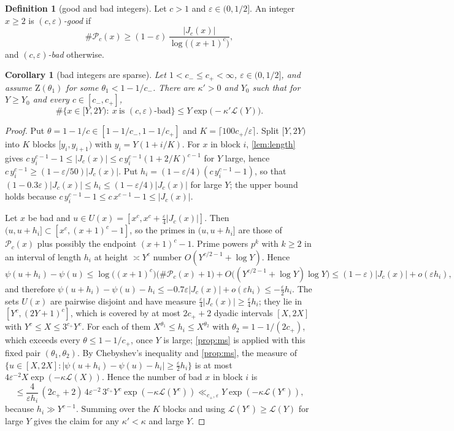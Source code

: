 \documentclass[11pt,a4paper]{article}
\newtheorem{corollary}[theorem]{Corollary}
\theoremstyle{definition}
\newtheorem{definition}[theorem]{Definition}
\newcommand{\PP}{\mathcal{P}}
\newcommand{\eps}{\varepsilon}
\begin{document}
\begin{definition}[good and bad integers]\label{def:good}
Let $c>1$ and $\eps\in(0,1/2]$. An integer $x\ge2$ is \emph{$(c,\eps)$-good} if
\[
 \#\PP_c(x)\ge(1-\eps)\,\frac{|J_c(x)|}{\log\bigl((x+1)^c\bigr)},
\]
and \emph{$(c,\eps)$-bad} otherwise.
\end{definition}

\begin{corollary}[bad integers are sparse]\label{cor:bad}
Let $1<c_-\le c_+<\infty$, $\eps\in(0,1/2]$, and assume $\mathrm Z(\theta_1)$ for some
$\theta_1<1-1/c_-$. There are $\kappa'>0$ and $Y_0$ such that for $Y\ge Y_0$ and every $c\in[c_-,c_+]$,
\[
 \#\{x\in[Y,2Y):\ x\ \text{is }(c,\eps)\text{-bad}\}\le Y\exp\bigl(-\kappa'\mathcal L(Y)\bigr).
\]
\end{corollary}

\begin{proof}
Put $\theta=1-1/c\in[1-1/c_-,1-1/c_+]$ and $K=\lceil100c_+/\eps\rceil$. Split $[Y,2Y)$ into $K$ blocks
$[y_i,y_{i+1})$ with $y_i=Y(1+i/K)$. For $x$ in block $i$, \cref{lem:length} gives
$c\,y_i^{c-1}-1\le|J_c(x)|\le c\,y_i^{c-1}(1+2/K)^{c-1}$ for $Y$ large, hence
$c\,y_i^{c-1}\ge(1-\eps/50)|J_c(x)|$. Put $h_i=(1-\eps/4)(c\,y_i^{c-1}-1)$, so that
$(1-0.3\eps)|J_c(x)|\le h_i\le(1-\eps/4)|J_c(x)|$ for large $Y$; the upper bound holds because
$c\,y_i^{c-1}-1\le c\,x^{c-1}-1\le|J_c(x)|$.

Let $x$ be bad and $u\in U(x)=[x^c,x^c+\tfrac\eps4|J_c(x)|]$. Then $(u,u+h_i]\subset[x^c,(x+1)^c-1]$, so the primes in
$(u,u+h_i]$ are those of $\PP_c(x)$ plus possibly the endpoint $(x+1)^c-1$. Prime powers $p^k$ with
$k\ge2$ in an interval of length $h_i$ at height $\asymp Y^c$ number $O(Y^{c/2-1}+\log Y)$. Hence
\[
 \psi(u+h_i)-\psi(u)\le\log\bigl((x+1)^c\bigr)\bigl(\#\PP_c(x)+1\bigr)+O\bigl((Y^{c/2-1}+\log Y)\log Y\bigr)
 \le(1-\eps)|J_c(x)|+o(\eps h_i),
\]
and therefore $\psi(u+h_i)-\psi(u)-h_i\le-0.7\eps|J_c(x)|+o(\eps h_i)\le-\tfrac{\eps}{2}h_i$.
The sets $U(x)$ are pairwise disjoint and have measure $\tfrac\eps4|J_c(x)|\ge\tfrac\eps4h_i$; they lie in
$[Y^c,(2Y+1)^c]$, which is covered by at most $2c_++2$ dyadic intervals $[X,2X]$ with $Y^c\le X\le3^{c_+}Y^c$.
For each of them $X^{\theta_1}\le h_i\le X^{\theta_2}$ with $\theta_2=1-1/(2c_+)$, which exceeds every $\theta\le1-1/c_+$, once $Y$ is large; \cref{prop:ms} is applied with this fixed pair $(\theta_1,\theta_2)$.
By Chebyshev's inequality and \cref{prop:ms}, the measure of
$\{u\in[X,2X]:|\psi(u+h_i)-\psi(u)-h_i|\ge\tfrac\eps2h_i\}$ is at most $4\eps^{-2}X\exp(-\kappa\mathcal L(X))$.
Hence the number of bad $x$ in block $i$ is
\[
 \le\frac{4}{\eps h_i}\,(2c_++2)\,4\eps^{-2}\,3^{c_+}Y^c\exp(-\kappa\mathcal L(Y^c))
 \ll_{c_+,\eps}Y\exp(-\kappa\mathcal L(Y^c)),
\]
because $h_i\gg Y^{c-1}$. Summing over the $K$ blocks and using $\mathcal L(Y^c)\ge\mathcal L(Y)$ for large $Y$
gives the claim for any $\kappa'<\kappa$ and large $Y$.
\end{proof}
\end{document}
